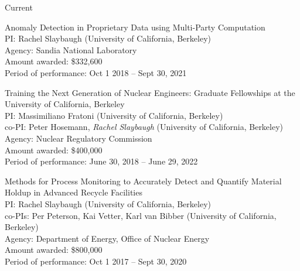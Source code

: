 \begin{rSubsection}{Current}{}{}{}
\item Anomaly Detection in Proprietary Data using Multi-Party Computation	\\
PI: Rachel Slaybaugh (University of California, Berkeley) \\
Agency: Sandia National Laboratory \\
Amount awarded: \$332,600\\
Period of performance: Oct 1 2018 -- Sept 30, 2021\\

\vspace*{0.3 em}
\item Training the Next Generation of Nuclear Engineers: Graduate Fellowships at the University of California, Berkeley	\\
PI: Massimiliano Fratoni (University of California, Berkeley) \\
\hspace*{1 em} co-PI: Peter Hosemann, \textit{Rachel Slaybaugh} (University of California, Berkeley)\\
Agency: Nuclear Regulatory Commission \\
Amount awarded: \$400,000\\
Period of performance: June 30, 2018 -- June 29, 2022

\vspace*{0.3 em}
\item Methods for Process Monitoring to Accurately Detect and Quantify Material Holdup in Advanced Recycle Facilities	\\
PI: Rachel Slaybaugh (University of California, Berkeley) \\
\hspace*{1 em} co-PIs:  Per Peterson, Kai Vetter, Karl van Bibber (University of California, Berkeley)\\
Agency: Department of Energy, Office of Nuclear Energy \\
Amount awarded: \$800,000\\
Period of performance: Oct 1 2017 -- Sept 30, 2020


\end{rSubsection}
